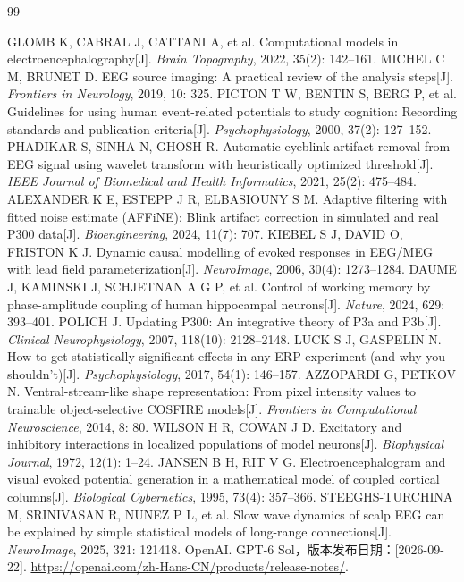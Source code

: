 \documentclass[a4paper]{ctexart}
\numberwithin{figure}{section}       %
\begin{document}
\clearpage
\begin{thebibliography}{99}
GLOMB K, CABRAL J, CATTANI A, et al. Computational models in electroencephalography[J]. \emph{Brain Topography}, 2022, 35(2): 142--161.
MICHEL C M, BRUNET D. EEG source imaging: A practical review of the analysis steps[J]. \emph{Frontiers in Neurology}, 2019, 10: 325.
PICTON T W, BENTIN S, BERG P, et al. Guidelines for using human event-related potentials to study cognition: Recording standards and publication criteria[J]. \emph{Psychophysiology}, 2000, 37(2): 127--152.
PHADIKAR S, SINHA N, GHOSH R. Automatic eyeblink artifact removal from EEG signal using wavelet transform with heuristically optimized threshold[J]. \emph{IEEE Journal of Biomedical and Health Informatics}, 2021, 25(2): 475--484.
ALEXANDER K E, ESTEPP J R, ELBASIOUNY S M. Adaptive filtering with fitted noise estimate (AFFiNE): Blink artifact correction in simulated and real P300 data[J]. \emph{Bioengineering}, 2024, 11(7): 707.
KIEBEL S J, DAVID O, FRISTON K J. Dynamic causal modelling of evoked responses in EEG/MEG with lead field parameterization[J]. \emph{NeuroImage}, 2006, 30(4): 1273--1284.
DAUME J, KAMINSKI J, SCHJETNAN A G P, et al. Control of working memory by phase-amplitude coupling of human hippocampal neurons[J]. \emph{Nature}, 2024, 629: 393--401.
POLICH J. Updating P300: An integrative theory of P3a and P3b[J]. \emph{Clinical Neurophysiology}, 2007, 118(10): 2128--2148.
LUCK S J, GASPELIN N. How to get statistically significant effects in any ERP experiment (and why you shouldn't)[J]. \emph{Psychophysiology}, 2017, 54(1): 146--157.
AZZOPARDI G, PETKOV N. Ventral-stream-like shape representation: From pixel intensity values to trainable object-selective COSFIRE models[J]. \emph{Frontiers in Computational Neuroscience}, 2014, 8: 80.
WILSON H R, COWAN J D. Excitatory and inhibitory interactions in localized populations of model neurons[J]. \emph{Biophysical Journal}, 1972, 12(1): 1--24.
JANSEN B H, RIT V G. Electroencephalogram and visual evoked potential generation in a mathematical model of coupled cortical columns[J]. \emph{Biological Cybernetics}, 1995, 73(4): 357--366.
STEEGHS-TURCHINA M, SRINIVASAN R, NUNEZ P L, et al. Slow wave dynamics of scalp EEG can be explained by simple statistical models of long-range connections[J]. \emph{NeuroImage}, 2025, 321: 121418.
OpenAI. GPT-6 Sol，版本发布日期：[2026-09-22].
\url{https://openai.com/zh-Hans-CN/products/release-notes/}.
\end{thebibliography}
\end{document}
